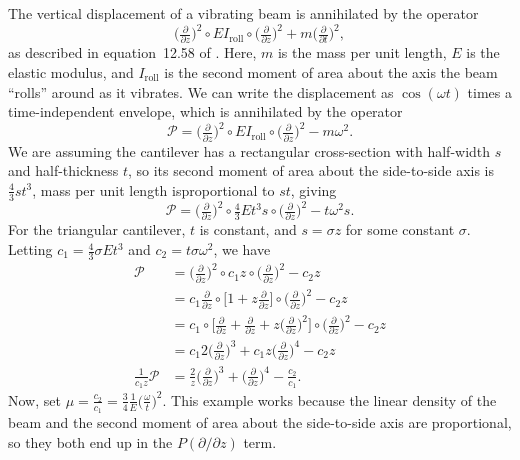 \documentclass{article}
\theoremstyle{definition}
\theoremstyle{plain}
\newenvironment{verify}{\color{ForestGreen}}{\color{black}}
\begin{document}
\begin{verify}
The vertical displacement of a vibrating beam is annihilated by the operator
\[ \big(\tfrac{\partial}{\partial z}\big)^2 \circ EI_\text{roll} \circ \big(\tfrac{\partial}{\partial z}\big)^2 + m \big(\tfrac{\partial}{\partial t}\big)^2, \]
as described in equation~12.58 of \cite{genta2009vibration}. Here, $m$ is the mass per unit length, $E$ is the elastic modulus, and $I_\text{roll}$ is the second moment of area about the axis the beam ``rolls'' around as it vibrates. We can write the displacement as $\cos(\omega t)$ times a time-independent envelope, which is annihilated by the operator
\[ \mathcal{P} = \big(\tfrac{\partial}{\partial z}\big)^2 \circ EI_\text{roll} \circ \big(\tfrac{\partial}{\partial z}\big)^2 - m\omega^2. \]
We are assuming the cantilever has a rectangular cross-section with half-width $s$ and half-thickness $t$, so its second moment of area about the side-to-side axis is $\tfrac{4}{3}st^3$, mass per unit length isproportional to $st$, giving
\[ \mathcal{P} = \big(\tfrac{\partial}{\partial z}\big)^2 \circ \tfrac{4}{3}Et^3 s \circ \big(\tfrac{\partial}{\partial z}\big)^2 - t\omega^2 s. \]
For the triangular cantilever, $t$ is constant, and $s = \sigma z$ for some constant $\sigma$. Letting $c_1 = \tfrac{4}{3}\sigma Et^3$ and $c_2 = t\sigma\omega^2$, we have
\begin{align*}
\mathcal{P} & = \big(\tfrac{\partial}{\partial z}\big)^2 \circ c_1 z \circ \big(\tfrac{\partial}{\partial z}\big)^2 - c_2 z \\
& = c_1 \tfrac{\partial}{\partial z} \circ \big[ 1 + z \tfrac{\partial}{\partial z} \big] \circ \big(\tfrac{\partial}{\partial z}\big)^2 - c_2 z \\
& = c_1 \circ \big[ \tfrac{\partial}{\partial z} + \tfrac{\partial}{\partial z} + z \big(\tfrac{\partial}{\partial z}\big)^2 \big] \circ \big(\tfrac{\partial}{\partial z}\big)^2 - c_2 z \\
& = c_1 2\big(\tfrac{\partial}{\partial z}\big)^3 + c_1 z \big(\tfrac{\partial}{\partial z}\big)^4 - c_2 z \\
\tfrac{1}{c_1 z} \mathcal{P} & = \tfrac{2}{z} \big(\tfrac{\partial}{\partial z}\big)^3 + \big(\tfrac{\partial}{\partial z}\big)^4 - \tfrac{c_2}{c_1}.
\end{align*}
Now, set $\mu = \tfrac{c_2}{c_1} = \tfrac{3}{4} \tfrac{1}{E} \big(\tfrac{\omega}{t}\big)^2$. This example works because the linear density of the beam and the second moment of area about the side-to-side axis are proportional, so they both end up in the $P(\partial/\partial z)$ term.\par
\end{verify}
\end{document}
